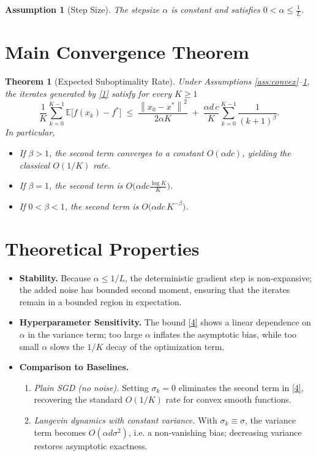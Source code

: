 \documentclass{article}
\newtheorem{theorem}{Theorem}
\newtheorem{assumption}{Assumption}
\newcommand{\E}{\mathbb{E}}
\newcommand{\norm}[1]{\left\lVert#1\right\rVert}
\begin{document}
\begin{assumption}[Step Size]\label{ass:step}
The stepsize $\alpha$ is constant and satisfies $0<\alpha\le \frac{1}{L}$.
\end{assumption}

\section*{Main Convergence Theorem}
\begin{theorem}[Expected Suboptimality Rate]\label{thm:main}
Under Assumptions \ref{ass:convex}–\ref{ass:step}, the iterates generated by \eqref{1} satisfy for every $K\ge1$
\[
\boxed{
\frac{1}{K}\sum_{k=0}^{K-1}\E\!\bigl[f(x_{k})-f^{*}\bigr]
\;\le\;
\frac{\norm{x_{0}-x^{*}}^{2}}{2\alpha K}
\;+\;
\frac{\alpha d\,c}{K}\sum_{k=0}^{K-1}\frac{1}{(k+1)^{\beta}} .
}
\tag{4}
\]
In particular,
\begin{itemize}
\item If $\beta>1$, the second term converges to a constant $O(\alpha d c)$, yielding the classical $O(1/K)$ rate.
\item If $\beta=1$, the second term is $O\!\bigl(\alpha d c\frac{\log K}{K}\bigr)$.
\item If $0<\beta<1$, the second term is $O\!\bigl(\alpha d c\,K^{-\beta}\bigr)$.
\end{itemize}
\end{theorem}

\section*{Theoretical Properties}
\begin{itemize}
\item \textbf{Stability.} Because $\alpha\le 1/L$, the deterministic gradient step is non‑expansive; the added noise has bounded second moment, ensuring that the iterates remain in a bounded region in expectation.
\item \textbf{Hyperparameter Sensitivity.} The bound \eqref{4} shows a linear dependence on $\alpha$ in the variance term; too large $\alpha$ inflates the asymptotic bias, while too small $\alpha$ slows the $1/K$ decay of the optimization term.
\item \textbf{Comparison to Baselines.}
    \begin{enumerate}
        \item \emph{Plain SGD (no noise).} Setting $\sigma_{k}=0$ eliminates the second term in \eqref{4}, recovering the standard $O(1/K)$ rate for convex smooth functions.
        \item \emph{Langevin dynamics with constant variance.} With $\sigma_{k}\equiv\sigma$, the variance term becomes $O(\alpha d\sigma^{2})$, i.e. a non‑vanishing bias; decreasing variance restores asymptotic exactness.
    \end{enumerate}
\end{itemize}
\end{document}
